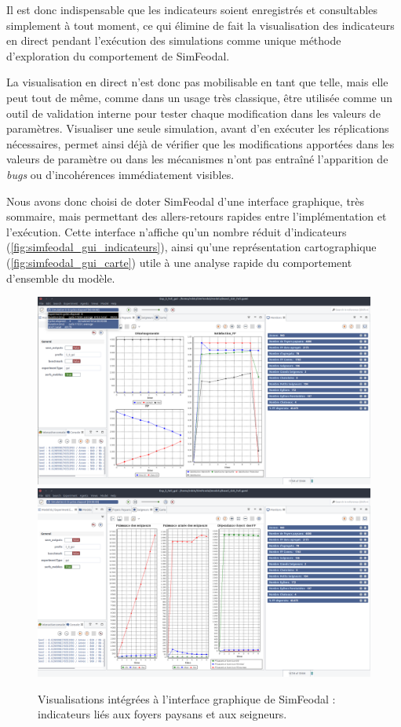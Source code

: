 	Il est donc indispensable que les indicateurs soient enregistrés et consultables simplement à tout moment, ce qui élimine de fait la visualisation des indicateurs en direct pendant l'exécution des simulations comme unique méthode d'exploration du comportement de SimFeodal.

	La visualisation en direct n'est donc pas mobilisable en tant que telle, mais elle peut tout de même, comme dans un usage très classique, être utilisée comme un outil de validation interne pour tester chaque modification dans les valeurs de paramètres.
	Visualiser une seule simulation, avant d'en exécuter les réplications nécessaires, permet ainsi déjà de vérifier que les modifications apportées dans les valeurs de paramètre ou dans les mécanismes n'ont pas entraîné l'apparition de \textit{bugs} ou d'incohérences immédiatement visibles.

	Nous avons donc choisi de doter SimFeodal d'une interface graphique, très sommaire, mais permettant des allers-retours rapides entre l'implémentation et l'exécution.
	Cette interface n'affiche qu'un nombre réduit d'indicateurs (\autoref{fig:simfeodal_gui_indicateurs}), ainsi qu'une représentation cartographique (\autoref{fig:simfeodal_gui_carte}) utile à une analyse rapide du comportement d'ensemble du modèle.

\begin{figure}[H]
	\captionsetup{width=\linewidth}
	\includegraphics[width=0.5\linewidth]{img/SimFeodal_GUI_FP.png}
	\includegraphics[width=0.5\linewidth]{img/SimFeodal_GUI_seigneurs.png}
	\caption{Visualisations intégrées à l'interface graphique de SimFeodal : indicateurs liés aux foyers paysans et aux seigneurs.}
	\label{fig:simfeodal_gui_indicateurs}
\end{figure}

